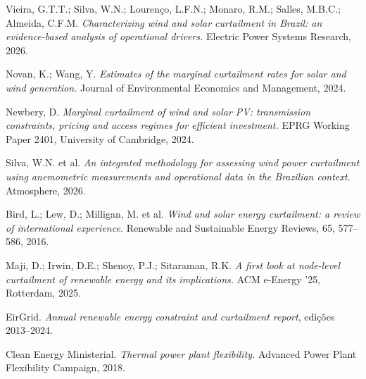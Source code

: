 \documentclass[10pt]{article}
\newcommand{\bloco}[1]{\vspace{2pt}{\color{vermelho}\footnotesize\textbf{#1}}\par\vspace{-2pt}}
\begin{document}
\begin{minipage}[t]{0.485\linewidth}\vspace{0pt}\footnotesize
\bloco{Curtailment e despacho}
Vieira, G.T.T.; Silva, W.N.; Lourenço, L.F.N.; Monaro, R.M.; Salles, M.B.C.;
Almeida, C.F.M. \textit{Characterizing wind and solar curtailment in Brazil: an
evidence-based analysis of operational drivers.} Electric Power Systems Research,
2026. \par\vspace{2pt}
Novan, K.; Wang, Y. \textit{Estimates of the marginal curtailment rates for solar and
wind generation.} Journal of Environmental Economics and Management, 2024.
\par\vspace{2pt}
Newbery, D. \textit{Marginal curtailment of wind and solar PV: transmission
constraints, pricing and access regimes for efficient investment.} EPRG Working
Paper 2401, University of Cambridge, 2024. \par\vspace{2pt}
Silva, W.N. et al. \textit{An integrated methodology for assessing wind power
curtailment using anemometric measurements and operational data in the Brazilian
context.} Atmosphere, 2026. \par\vspace{2pt}
Bird, L.; Lew, D.; Milligan, M. et al. \textit{Wind and solar energy curtailment: a
review of international experience.} Renewable and Sustainable Energy Reviews, 65,
577--586, 2016. \par\vspace{2pt}
Maji, D.; Irwin, D.E.; Shenoy, P.J.; Sitaraman, R.K. \textit{A first look at
node-level curtailment of renewable energy and its implications.} ACM e-Energy '25,
Rotterdam, 2025. \par\vspace{2pt}
EirGrid. \textit{Annual renewable energy constraint and curtailment report}, edições
2013--2024. \par\vspace{2pt}
Clean Energy Ministerial. \textit{Thermal power plant flexibility.} Advanced Power
Plant Flexibility Campaign, 2018.


\end{minipage}
\end{document}
